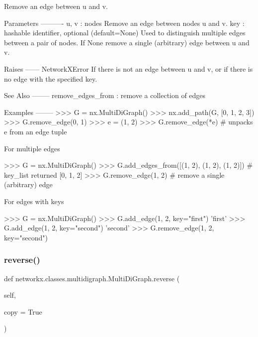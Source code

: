 \begin{DoxyVerb}Remove an edge between u and v.

Parameters
----------
u, v : nodes
    Remove an edge between nodes u and v.
key : hashable identifier, optional (default=None)
    Used to distinguish multiple edges between a pair of nodes.
    If None remove a single (arbitrary) edge between u and v.

Raises
------
NetworkXError
    If there is not an edge between u and v, or
    if there is no edge with the specified key.

See Also
--------
remove_edges_from : remove a collection of edges

Examples
--------
>>> G = nx.MultiDiGraph()
>>> nx.add_path(G, [0, 1, 2, 3])
>>> G.remove_edge(0, 1)
>>> e = (1, 2)
>>> G.remove_edge(*e)  # unpacks e from an edge tuple

For multiple edges

>>> G = nx.MultiDiGraph()
>>> G.add_edges_from([(1, 2), (1, 2), (1, 2)])  # key_list returned
[0, 1, 2]
>>> G.remove_edge(1, 2)  # remove a single (arbitrary) edge

For edges with keys

>>> G = nx.MultiDiGraph()
>>> G.add_edge(1, 2, key="first")
'first'
>>> G.add_edge(1, 2, key="second")
'second'
>>> G.remove_edge(1, 2, key="second")\end{DoxyVerb}
 \mbox{\label{classnetworkx_1_1classes_1_1multidigraph_1_1MultiDiGraph_ad4cf991d396acd5bec6bbc4b95639600}} 
\subsubsection{\texorpdfstring{reverse()}{reverse()}}
{\footnotesize\ttfamily def networkx.\+classes.\+multidigraph.\+Multi\+Di\+Graph.\+reverse (\begin{DoxyParamCaption}\item[{}]{self,  }\item[{}]{copy = {\ttfamily True} }\end{DoxyParamCaption})}

